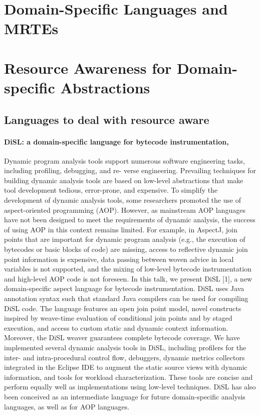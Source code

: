 \section{Domain-Specific Languages and MRTEs} \label{sec:DSL-on-MRTEs}

\section{Resource Awareness for Domain-specific Abstractions} \label{sec:resource-awareness-for-dsl}

\subsection{Languages to deal with resource aware}

\paragraph{DiSL: a domain-specific language for bytecode instrumentation, \cite{Marek:2012:DEL:2162037.2162046,Marek2012}}
Dynamic program analysis tools support numerous software engineering tasks, including profiling, debugging, and re-
verse engineering.
Prevailing techniques for building dynamic analysis tools are based on low-level abstractions
that make tool development tedious, error-prone, and expensive. To simplify the development of dynamic analysis tools,
some researchers promoted the use of aspect-oriented programming (AOP). However, as mainstream AOP languages
have not been designed to meet the requirements of dynamic analysis, the success of using AOP in this context remains
limited. For example, in AspectJ, join points that are important for dynamic program analysis (e.g., the execution of
bytecodes or basic blocks of code) are missing, access to reflective dynamic join point information is expensive, data
passing between woven advice in local variables is not supported, and the mixing of low-level bytecode instrumentation
and high-level AOP code is not foreseen. In this talk, we present DiSL [1], a new domain-specific aspect language for
bytecode instrumentation.
DiSL uses Java annotation syntax such that standard Java compilers can be used for compiling
DiSL code. The language features an open join point model, novel constructs inspired by weave-time evaluation of
conditional join points and by staged execution, and access to custom static and dynamic context information.
Moreover, the DiSL weaver guarantees complete bytecode coverage.
We have implemented several dynamic analysis tools in DiSL,
including profilers for the inter- and intra-procedural control
flow, debuggers, dynamic metrics collectors integrated in the
Eclipse IDE to augment the static source views with dynamic information, and tools for workload characterization.
These tools are concise and perform equally well as implementations using low-level techniques. DiSL has also been
conceived as an intermediate language for future domain-specific analysis languages, as well as for AOP languages.

